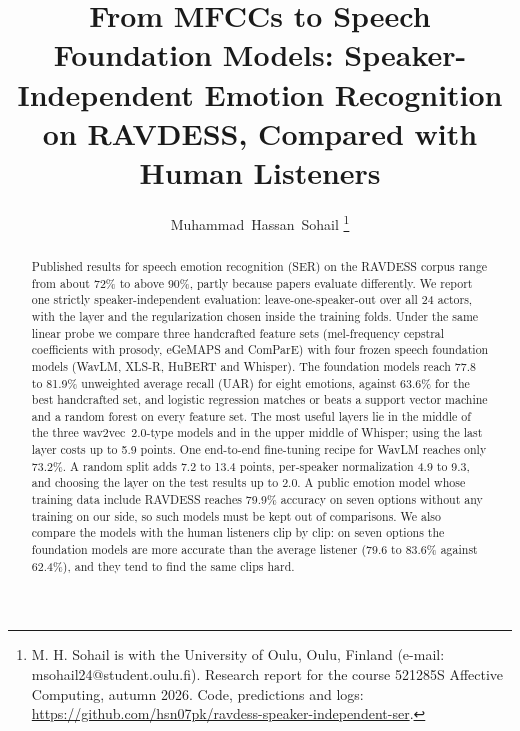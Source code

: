 \documentclass[journal]{IEEEtran}
\begin{document}
\title{From MFCCs to Speech Foundation Models: Speaker-Independent Emotion Recognition on RAVDESS, Compared with Human Listeners}

\author{Muhammad~Hassan~Sohail%
\thanks{M. H. Sohail is with the University of Oulu, Oulu, Finland (e-mail: msohail24@student.oulu.fi). Research report for the course 521285S Affective Computing, autumn 2026. Code, predictions and logs: \url{https://github.com/hsn07pk/ravdess-speaker-independent-ser}.}}


\maketitle

\begin{abstract}
Published results for speech emotion recognition (SER) on the RAVDESS corpus range from about 72\% to above 90\%, partly because papers evaluate differently. We report one strictly speaker-independent evaluation: leave-one-speaker-out over all 24 actors, with the layer and the regularization chosen inside the training folds. Under the same linear probe we compare three handcrafted feature sets (mel-frequency cepstral coefficients with prosody, eGeMAPS and ComParE) with four frozen speech foundation models (WavLM, XLS-R, HuBERT and Whisper). The foundation models reach 77.8 to 81.9\% unweighted average recall (UAR) for eight emotions, against 63.6\% for the best handcrafted set, and logistic regression matches or beats a support vector machine and a random forest on every feature set. The most useful layers lie in the middle of the three wav2vec~2.0-type models and in the upper middle of Whisper; using the last layer costs up to 5.9 points. One end-to-end fine-tuning recipe for WavLM reaches only 73.2\%. A random split adds 7.2 to 13.4 points, per-speaker normalization 4.9 to 9.3, and choosing the layer on the test results up to 2.0. A public emotion model whose training data include RAVDESS reaches 79.9\% accuracy on seven options without any training on our side, so such models must be kept out of comparisons. We also compare the models with the human listeners clip by clip: on seven options the foundation models are more accurate than the average listener (79.6 to 83.6\% against 62.4\%), and they tend to find the same clips hard.
\end{abstract}
\end{document}
